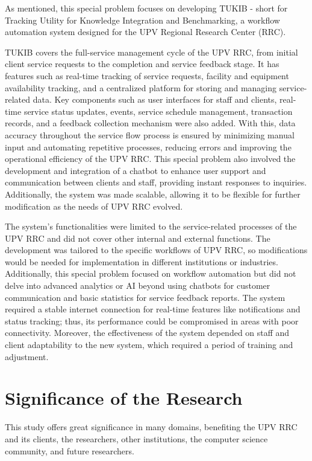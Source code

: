 As mentioned, this special problem focuses on developing TUKIB - short for Tracking Utility for Knowledge Integration and Benchmarking, a workflow automation system designed for the UPV Regional Research Center (RRC). 

TUKIB covers the full-service management cycle of the UPV RRC, from initial client service requests to the completion and service feedback stage. It has features such as real-time tracking of service requests, facility and equipment availability tracking, and a centralized platform for storing and managing service-related data. Key components such as user interfaces for staff and clients, real-time service status updates, events, service schedule management, transaction records, and a feedback collection mechanism were also added. With this, data accuracy throughout the service flow process is ensured by minimizing manual input and automating repetitive processes, reducing errors and improving the operational efficiency of the UPV RRC. This special problem also involved the development and integration of a chatbot to enhance user support and communication between clients and staff, providing instant responses to inquiries. Additionally, the system was made scalable, allowing it to be flexible for further modification as the needs of UPV RRC evolved.

The system’s functionalities were limited to the service-related processes of the UPV RRC and did not cover other internal and external functions. The development was tailored to the specific workflows of UPV RRC, so modifications would be needed for implementation in different institutions or industries. Additionally, this special problem focused on workflow automation but did not delve into advanced analytics or AI beyond using chatbots for customer communication and basic statistics for service feedback reports. The system required a stable internet connection for real-time features like notifications and status tracking; thus, its performance could be compromised in areas with poor connectivity. Moreover, the effectiveness of the system depended on staff and client adaptability to the new system, which required a period of training and adjustment.


\section{Significance of the Research}
\label{sec:significance}

This study offers great significance in many domains, benefiting the UPV RRC and its clients, the researchers, other institutions, the computer science community, and future researchers.

